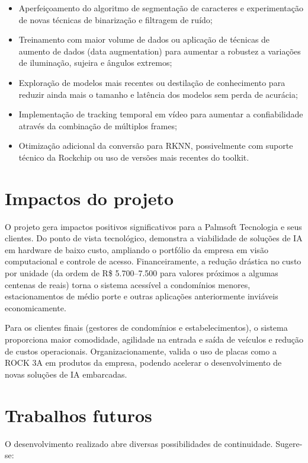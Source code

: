 \begin{itemize}
    \item Aperfeiçoamento do algoritmo de segmentação de caracteres e experimentação de novas técnicas de binarização e filtragem de ruído;
    \item Treinamento com maior volume de dados ou aplicação de técnicas de aumento de dados (data augmentation) para aumentar a robustez a variações de iluminação, sujeira e ângulos extremos;
    \item Exploração de modelos mais recentes ou destilação de conhecimento para reduzir ainda mais o tamanho e latência dos modelos sem perda de acurácia;
    \item Implementação de tracking temporal em vídeo para aumentar a confiabilidade através da combinação de múltiplos frames;
    \item Otimização adicional da conversão para RKNN, possivelmente com suporte técnico da Rockchip ou uso de versões mais recentes do toolkit.
\end{itemize}

\section{Impactos do projeto}

O projeto gera impactos positivos significativos para a Palmsoft Tecnologia e seus clientes. Do ponto de vista tecnológico, demonstra a viabilidade de soluções de IA em hardware de baixo custo, ampliando o portfólio da empresa em visão computacional e controle de acesso. Financeiramente, a redução drástica no custo por unidade (da ordem de R\$ 5.700--7.500 para valores próximos a algumas centenas de reais) torna o sistema acessível a condomínios menores, estacionamentos de médio porte e outras aplicações anteriormente inviáveis economicamente.

Para os clientes finais (gestores de condomínios e estabelecimentos), o sistema proporciona maior comodidade, agilidade na entrada e saída de veículos e redução de custos operacionais. Organizacionamente, valida o uso de placas como a ROCK 3A em produtos da empresa, podendo acelerar o desenvolvimento de novas soluções de IA embarcadas.

\section{Trabalhos futuros}

O desenvolvimento realizado abre diversas possibilidades de continuidade. Sugere-se:

